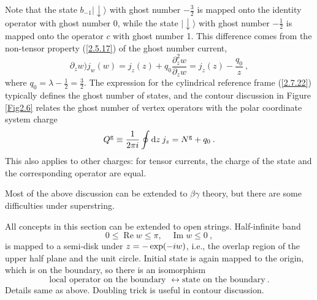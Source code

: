 Note that the state $b_{-1}\lvert \downarrow\rangle$ with ghost number $-\frac{3}{2}$ is mapped onto the identity operator with ghost number 0, while the state $\lvert \downarrow\rangle$ with ghost number $-\frac{1}{2}$ is mapped onto the operator $c$ with ghost number 1. This difference comes from the non-tensor property (\ref{2.5.17}) of the ghost number current,    
\begin{equation}
	\partial_{z} w) j_{w}(w)=j_{z}(z)+q_{0} \frac{\partial_{z}^{2} w}{\partial_{z} w}=j_{z}(z)-\frac{q_{0}}{z} \:, \label{2.8.13}
\end{equation}
where $q_{0}=\lambda-\frac{1}{2}=\frac{3}{2}$.    
The expression for the cylindrical reference frame (\ref{2.7.22}) typically defines the ghost number of states, and the contour discussion in Figure \ref{Fig2.6} relates the ghost number of vertex operators with the polar coordinate system charge    
\begin{equation}
	Q^{\mathrm{g}} \equiv \frac{1}{2 \pi i} \oint \mathrm{d} z\: j_{z}=N^{\mathrm{g}}+q_{0} \:.\label{2.8.14}
\end{equation}
This also applies to other charges: for tensor currents, the charge of the state and the corresponding operator are equal.    

Most of the above discussion can be extended to $\beta\gamma$ theory, but there are some difficulties under superstring.    

All concepts in this section can be extended to open strings.    
Half-infinite band    
\begin{equation}
	0 \leq \operatorname{Re} w \leq \pi, \quad \operatorname{Im} w \leq 0 \:, \label{2.8.15}
\end{equation}
is mapped to a semi-disk under $z=-\exp (-i w)$, i.e., the overlap region of the upper half plane and the unit circle.    
Initial state is again mapped to the origin, which is on the boundary, so there is an isomorphism    
\begin{equation}
	\text {local operator on the boundary } \leftrightarrow \text {state on the boundary} \:. \label{2.8.16}
\end{equation}
Details same as above. Doubling trick is useful in contour discussion.    

